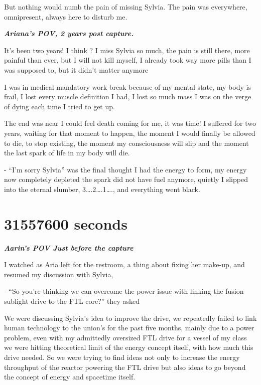 \documentclass[colorlinks,12pt,a4paper]{book}
\begin{document}
But nothing would numb the pain of missing Sylvia. The pain was everywhere, omnipresent, always here to disturb me.\par
\bigskip 

\textit{\textbf{Ariana's POV, 2 years post capture.}}

It's been two years! I think ? I miss Sylvia so much, the pain is still there, more painful than ever, but I will not kill 
myself, I already took way more pills than I was supposed to, but it didn't matter anymore\par
\bigskip

I was in medical mandatory work break because of my mental state, my body is frail, I lost every muscle definition I had, 
I lost so much mass I was on the verge of dying each time I tried to get up.\par
\bigskip

The end was near I could feel death coming for me, it was time! I suffered for two years, waiting for that moment to happen,
 the moment I would finally be allowed to die, to stop existing, the moment my consciousness will slip and the moment the
  last spark of life in my body will die.\par
  \bigskip

- “I'm sorry Sylvia” was the final thought I had the energy to form, my energy now completely depleted the spark did not
 have fuel anymore, quietly I slipped into the eternal slumber, 3….2….1…., and everything went black.\par
 \bigskip

 \chapter{31557600 seconds}
 \textit{\textbf{Aarin's POV Just before the capture}}\par
 \bigskip
 
 I watched as Aria left for the restroom, a thing about fixing her make-up, and resumed my discussion with Sylvia,\par
 \bigskip
 
 - “So you're thinking we can overcome the power issue with linking the fusion sublight drive to the FTL core?” they asked\par
 \bigskip
 
 We were discussing Sylvia's idea to improve the drive, we repeatedly failed to link human technology to the 
 union's for the past five months, mainly due to a power problem, even with my admittedly oversized FTL drive for
  a vessel of my class we were hitting theoretical limit of the energy concept itself, with how much this drive needed. 
  So we were trying to find ideas not only to increase the energy throughput of the reactor powering the FTL drive but 
  also ideas to go beyond the concept of energy and spacetime itself.\par
  \bigskip
 
\end{document}
